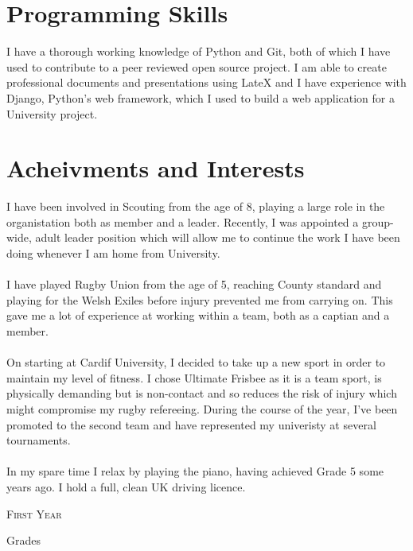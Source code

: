 \documentclass[a4paper]{article}
\begin{document}
\section{Programming Skills}
I have a thorough working knowledge of Python and Git, both of which I have used to contribute to a peer reviewed open source project. I am able to create professional documents and presentations using LateX and I have experience with Django, Python's web framework, which I used to build a web application for a University project.
\section{Acheivments and Interests}
I have been involved in Scouting from the age of 8, playing a large role in the organistation both as member and a leader. Recently, I was appointed a group-wide, adult leader position which will allow me to continue the work I have been doing whenever I am home from University. \\
\\
I have played Rugby Union from the age of 5, reaching County standard and playing for the Welsh Exiles before injury prevented me from carrying on. This gave me a lot of experience at working within a team, both as a captian and a member. \\
\\
On starting at Cardif University, I decided to take up a new sport in order to maintain my level of fitness. I chose Ultimate Frisbee as it is a team sport, is physically demanding but is non-contact and so reduces the risk of injury which might compromise my rugby refereeing. During the course of the year, I've been promoted to the second team and have represented my univeristy at several tournaments. \\
\\
In my spare time I relax by playing the piano, having achieved Grade 5 some years ago. I hold a full, clean UK driving licence.
\bigskip
\par{\centering\Large {\textsc{First Year}}
\par}\large{\centering Grades\par}\normalsize
\end{document}

